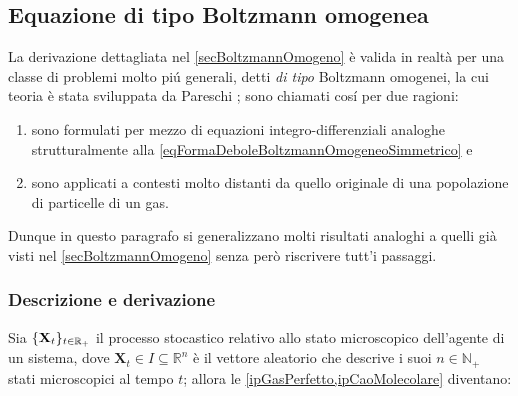     \subsection{Equazione di tipo Boltzmann omogenea}\label{secTipoBoltzmannOmogeno}

      La derivazione dettagliata nel \cref{secBoltzmannOmogeno} è valida in realtà per una classe di problemi molto piú generali, detti \textit{di tipo} Boltzmann omogenei, la cui teoria è stata sviluppata da Pareschi \etal{} \cite{PareschiIMS2013}; sono chiamati cosí per due ragioni:

      \begin{enumerate}[
        label=\arabic*.,
      ]
        \item sono formulati per mezzo di equazioni integro-differenziali analoghe strutturalmente alla \ref{eqFormaDeboleBoltzmannOmogeneoSimmetrico} e
        \item sono applicati a contesti\footnotemark{} molto distanti da quello originale di una popolazione di particelle di un gas.%
      \end{enumerate}
      
      Dunque in questo paragrafo si generalizzano molti risultati analoghi a quelli già visti nel \cref{secBoltzmannOmogeno} senza però riscrivere tutt'i passaggi.

      \subsubsection{Descrizione e derivazione}

        Sia \(\{\mathbf X_t\}_{t\in\mathbb R_+}\) il processo stocastico relativo allo stato microscopico dell'agente di un sistema, dove \(\mathbf X_t\in I\subseteq\mathbb R^n\) è il vettore aleatorio\footnotemark{} che descrive i suoi \(n\in\mathbb N_+\) stati microscopici al tempo \(t\); allora le \cref{ipGasPerfetto,ipCaoMolecolare} diventano:%

